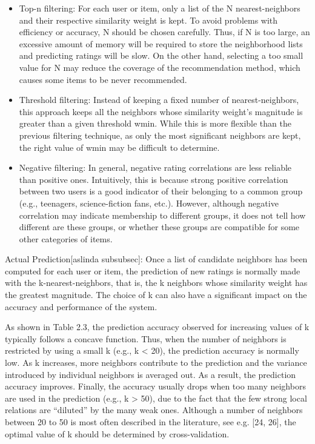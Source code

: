 \begin{itemize}
	\item Top-n filtering: For each user or item, only a list of the N nearest-neighbors and their respective similarity weight is kept. To avoid problems with efficiency or accuracy, N should be chosen carefully. Thus, if N is too large, an excessive amount of memory will be required to store the neighborhood lists and predicting ratings will be slow. On the other hand, selecting a too small value for N may reduce the coverage of the recommendation method, which causes some items to be never recommended.
	\item Threshold filtering: Instead of keeping a fixed number of nearest-neighbors, this approach keeps all the neighbors whose similarity weight’s magnitude is greater than a given threshold wmin. While this is more flexible than the previous filtering technique, as only the most significant neighbors are kept, the right value of wmin may be difficult to determine.
	\item Negative filtering: In general, negative rating correlations are less reliable than positive ones. Intuitively, this is because strong positive correlation between two users is a good indicator of their belonging to a common group (e.g., teenagers, science-fiction fans, etc.). However, although negative correlation may indicate membership to different groups, it does not tell how different are these groups, or whether these groups are compatible for some other categories of items.
\end{itemize}

Actual Prediction[aslinda subsubsec]: Once a list of candidate neighbors has been computed for each user or item, the prediction of new ratings is normally made with the k-nearest-neighbors, that is, the k neighbors whose similarity weight has the greatest magnitude. The choice of k can also have a significant impact on the accuracy and performance of the system.

As shown in Table 2.3, the prediction accuracy observed for increasing values of k typically follows a concave function. Thus, when the number of neighbors is restricted by using a small k (e.g., k < 20), the prediction accuracy is normally low. As k increases, more neighbors contribute to the prediction and the variance introduced by individual neighbors is averaged out. As a result, the prediction accuracy improves. Finally, the accuracy usually drops when too many neighbors are used in the prediction (e.g., k > 50), due to the fact that the few strong local relations are “diluted” by the many weak ones. Although a number of neighbors between 20 to 50 is most often described in the literature, see e.g. [24, 26], the optimal value of k should be determined by cross-validation.


